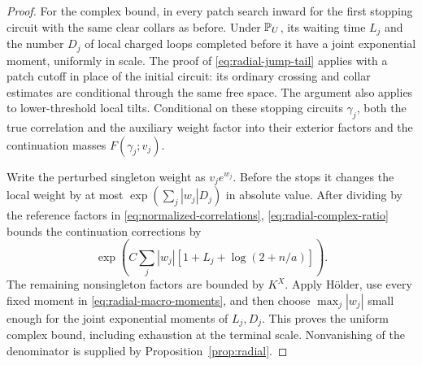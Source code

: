 \begin{proof}
For the complex bound, in every patch search inward for the first
stopping circuit with the same clear collars as before. Under
$\mathbb P_U$, its waiting time $L_j$ and the number $D_j$ of local charged
loops completed before it have a joint exponential moment, uniformly
in scale. The proof of \eqref{eq:radial-jump-tail} applies with a
patch cutoff in place of the initial circuit: its ordinary crossing
and collar estimates are conditional through the same free space.
The argument also applies to lower-threshold local tilts. Conditional
on these stopping circuits $\gamma_j$, both the true correlation
and the auxiliary weight factor into their exterior factors and
the continuation masses $F(\gamma_j;v_j)$.

Write the perturbed singleton weight as $v_je^{w_j}$. Before the
stops it changes the local weight by at most
$\exp(\sum_j|w_j|D_j)$ in absolute value. After dividing by the
reference factors in \eqref{eq:normalized-correlations},
\eqref{eq:radial-complex-ratio} bounds the continuation corrections
by
\[
 \exp\left(C\sum_j|w_j|
       [1+L_j+\log(2+n/a)]\right).
\]
The remaining nonsingleton factors are bounded by $K^X$. Apply
H\"older, use every fixed moment in
\eqref{eq:radial-macro-moments}, and then choose $\max_j|w_j|$ small
enough for the joint exponential moments of $L_j,D_j$.
This proves the uniform complex bound, including exhaustion at the
terminal scale. Nonvanishing of the denominator is supplied by
Proposition~\ref{prop:radial}.


\end{proof}
